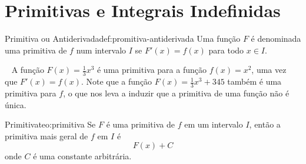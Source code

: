\section{Primitivas e Integrais Indefinidas}

\begin{definicao}{Primitiva ou Antiderivada}{def:promitiva-antiderivada}
  Uma função $F$ é denominada uma primitiva de $f$ num intervalo $I$ se
  $F'(x) = f(x)$ para todo $x \in I$.
\end{definicao}

\begin{example}~
  \solution
  A função $F(x)= \frac{1}{3}x^3$ é uma primitiva para a função $f(x)=x^2$,
  uma vez que $F'(x)=f(x)$. Note que a função $F(x)= \frac{1}{3}x^3+345$
  também é uma primitiva para $f$, o que nos leva a induzir que a
  primitiva de uma função não é única.
\end{example}

\begin{teorema}{Primitiva}{teo:primitiva}
  Se $F$ é uma primitiva de $f$ em um intervalo $I$, então a primitiva
  mais geral de $f$ em $I$ é
  \[
  F(x)+C
  \]
  onde $C$ é uma constante arbitrária.
\end{teorema}

